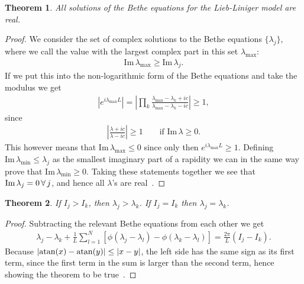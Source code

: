 \documentclass[11pt, a4paper]{report} %
\newtheorem{theorem}{Theorem}
\begin{document}
\begin{theorem}
All solutions of the Bethe equations for the Lieb-Liniger model are real.
\end{theorem}

\begin{proof}
We consider the set of complex solutions to the Bethe equations \(\{\lambda_j\}\), where we call the value with the largest complex part in this set \(\lambda_{\max}\):
\begin{align}
\textrm{Im} \, \lambda_{\max} \geq \textrm{Im} \, \lambda_j.
\end{align}
If we put this into the non-logarithmic form of the Bethe equations and take the modulus we get
\begin{align}
  \left| e^{i\lambda_{\max} L} \right|= \left| \prod_k \frac{\lambda_{\max} - \lambda_k + ic}{\lambda_{\max} - \lambda_k - ic} \right|\geq 1,
\end{align}
since
\begin{align}
\left|\frac{\lambda+ic}{\lambda-ic} \right| \geq 1 \qquad \textrm{if Im}\, \lambda \geq 0.
\end{align}
This however means that \(\textrm{Im}\, \lambda_{\max} \leq 0\) since only then \(e^{i\lambda_{\max}L} \geq 1\).
Defining \(\textrm{Im}\,\lambda_{\min}\leq \lambda_j\) as the smallest imaginary part of a rapidity we can in the same way prove that \(\textrm{Im}\,\lambda_{\min} \geq 0\).
Taking these statements together we see that \(\textrm{Im}\, \lambda_{j}=0\textrm{\,}\forall\textrm{\,} j\), and hence all  \(\lambda\)'s are real~\cite{Korepin1993}.
\end{proof}

\begin{theorem}\label{th:equalisequal}
If \(I_j >I_k\), then \(\lambda_j > \lambda_k\). If \(I_j=I_k\) then \(\lambda_j=\lambda_k\).
\end{theorem}

\begin{proof}
Subtracting the relevant Bethe equations from each other we get
\begin{align}
  \lambda_j - \lambda_k + \frac{1}{L}\sum_{l=1}^N \left[\phi(\lambda_j - \lambda_l) - \phi(\lambda_k - \lambda_l)\right] = \frac{2\pi}{L} (I_j - I_k).
\end{align}
Because \(\abs{\atan(x)-\atan(y)}\leq\abs{x-y}\), the left side has the same sign as its first term, since the first term in the sum is larger than the second term, hence showing the theorem to be true~\cite{Korepin1993,Gaudin2009}.
\end{proof}
\end{document}
